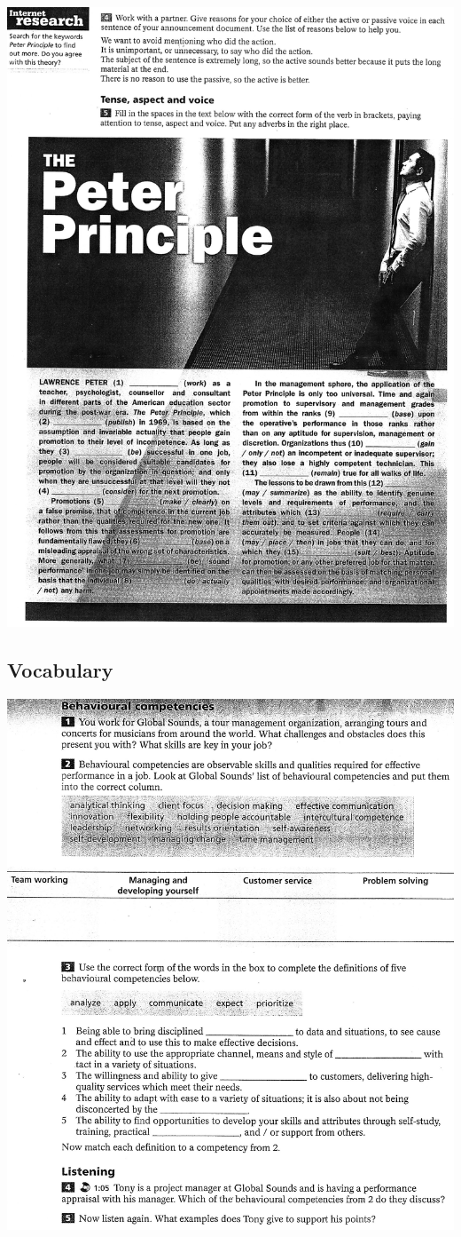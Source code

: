 \includegraphics[scale=.85]{handouts/Eng302.jpg}
\subsection{Vocabulary}
\includegraphics[scale=.85]{handouts/Eng303.jpg}
